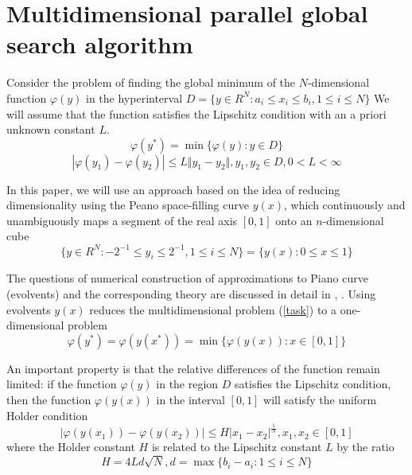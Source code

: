 \documentclass{svproc}
\begin{document}
\section{Multidimensional parallel global search algorithm}
Consider the problem of finding the global minimum of the \(N\)-dimensional function \(\varphi(y)\) in the hyperinterval  \(D=\{y\in R^N:a_i\leqslant x_i\leqslant{b_i}, 1\leqslant{i}\leqslant{N}\}\)  We will assume that the function satisfies the Lipschitz condition with an a priori unknown constant \(L\).
\begin{equation}
\label{task}
\varphi(y^*)=\min\{\varphi(y):y\in D\}
\end{equation}
\begin{equation}
\label{lip}
|\varphi(y_1)-\varphi(y_2)|\leqslant L\Vert y_1-y_2\Vert,y_1,y_2\in D,0<L<\infty
\end{equation}

In this paper, we will use an approach based on the idea of reducing dimensionality using the Peano space-filling curve \(y(x)\), which continuously and unambiguously maps a segment of the real axis \([0,1]\) onto an \(n\)-dimensional cube
\begin{equation}
\label{cube}
\lbrace y\in R^N:-2^{-1}\leqslant y_i\leqslant 2^{-1},1\leqslant i\leqslant N\rbrace=\{y(x):0\leqslant x\leqslant 1\}
\end{equation}

The questions of numerical construction of approximations to Piano curve (evolvents) and the corresponding theory are discussed in detail in \cite{Strongin2000}, \cite{Sergeyev2013}. Using evolvents \(y(x)\) reduces the multidimensional problem (\ref{task}) to a one-dimensional problem
\begin{displaymath}
\label{oneDimTask}
\varphi(y^*)=\varphi(y(x^*))=\min\{\varphi(y(x)):x\in [0,1]\}
\end{displaymath}

An important property is that the relative differences of the function remain limited: if the function \(\varphi(y)\) in the region \(D
\) satisfies the Lipschitz condition, then the function \(\varphi(y(x))\) in the interval \([0,1]\) will satisfy the uniform Holder condition
\begin{displaymath}
\label{holder}
|\varphi(y(x_1))-\varphi(y(x_2))|\leqslant H{|x_1-x_2|}^{\frac{1}{N}},x_1,x_2\in[0,1]
\end{displaymath}
where the Holder constant \(H\) is related to the Lipschitz constant \(L\) by the ratio
\begin{displaymath}
H=4Ld\sqrt{N},d=\max\{b_i-a_i:1\leqslant i\leqslant N\}
\end{displaymath}
\end{document}
